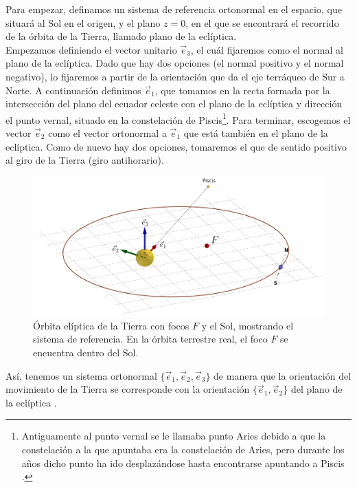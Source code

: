 Para empezar, definamos un sistema de referencia ortonormal en el espacio, que situará al Sol en el origen, y el plano $z=0$, en el que se encontrará el recorrido de la órbita de la Tierra, llamado plano de la eclíptica.\\

Empezamos definiendo el vector unitario $\vec{e}_3$, el cuál fijaremos como el normal al plano de la eclíptica. Dado que hay dos opciones (el normal positivo y el normal negativo), lo fijaremos a partir de la orientación que da el eje terráqueo de Sur a Norte. A continuación definimos $\vec{e}_1$, que tomamos en la recta formada por la intersección del plano del ecuador celeste con el plano de la eclíptica y dirección el punto vernal, situado en la constelación de Piscis\footnote{Antiguamente al punto vernal se le llamaba punto Aries debido a que la constelación a la que apuntaba era la constelación de Aries, pero durante los años dicho punto ha ido desplazándose hasta encontrarse apuntando a Piscis \cite{piscis}.}. Para terminar, escogemos el vector $\vec{e}_2$ como el vector ortonormal a $\vec{e}_1$ que está también en el plano de la eclíptica. Como de nuevo hay dos opciones, tomaremos el que de sentido positivo al giro de la Tierra (giro antihorario).\\

\begin{figure}[H]
\centering
\includegraphics[scale=0.3]{images/sistema_coordenadas.png}
\caption{Órbita elíptica de la Tierra con focos $F$ y el Sol, mostrando el sistema de referencia. En la órbita terrestre real, el foco $F$ se encuentra dentro del Sol.}
\label{fig:sistema_referencia}
\end{figure}

Así, tenemos un sistema ortonormal $\{\vec{e}_1,\vec{e}_2,\vec{e}_3\}$ de manera que la orientación del movimiento de la Tierra se corresponde con la orientación $\{\vec{e}_1,\vec{e}_2\}$ del plano de la eclíptica \cite{mecanica_celeste}.\\

